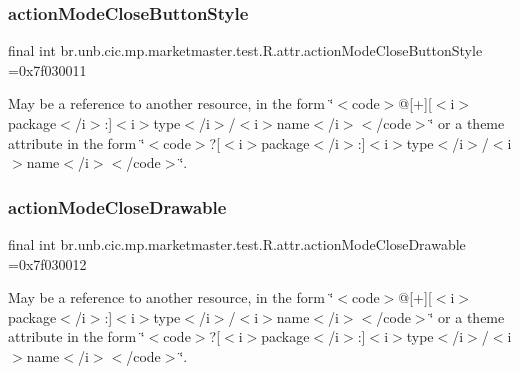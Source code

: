 \subsubsection{\texorpdfstring{action\+Mode\+Close\+Button\+Style}{actionModeCloseButtonStyle}}
{\footnotesize\ttfamily final int br.\+unb.\+cic.\+mp.\+marketmaster.\+test.\+R.\+attr.\+action\+Mode\+Close\+Button\+Style =0x7f030011\hspace{0.3cm}{\ttfamily [static]}}

May be a reference to another resource, in the form \char`\"{}$<$code$>$@\mbox{[}+\mbox{]}\mbox{[}$<$i$>$package$<$/i$>$\+:\mbox{]}$<$i$>$type$<$/i$>$/$<$i$>$name$<$/i$>$$<$/code$>$\char`\"{} or a theme attribute in the form \char`\"{}$<$code$>$?\mbox{[}$<$i$>$package$<$/i$>$\+:\mbox{]}$<$i$>$type$<$/i$>$/$<$i$>$name$<$/i$>$$<$/code$>$\char`\"{}. \mbox{\label{classbr_1_1unb_1_1cic_1_1mp_1_1marketmaster_1_1test_1_1R_1_1attr_a62a0b8e88696015318843bec6cb5d985}} 
\subsubsection{\texorpdfstring{action\+Mode\+Close\+Drawable}{actionModeCloseDrawable}}
{\footnotesize\ttfamily final int br.\+unb.\+cic.\+mp.\+marketmaster.\+test.\+R.\+attr.\+action\+Mode\+Close\+Drawable =0x7f030012\hspace{0.3cm}{\ttfamily [static]}}

May be a reference to another resource, in the form \char`\"{}$<$code$>$@\mbox{[}+\mbox{]}\mbox{[}$<$i$>$package$<$/i$>$\+:\mbox{]}$<$i$>$type$<$/i$>$/$<$i$>$name$<$/i$>$$<$/code$>$\char`\"{} or a theme attribute in the form \char`\"{}$<$code$>$?\mbox{[}$<$i$>$package$<$/i$>$\+:\mbox{]}$<$i$>$type$<$/i$>$/$<$i$>$name$<$/i$>$$<$/code$>$\char`\"{}. \mbox{\label{classbr_1_1unb_1_1cic_1_1mp_1_1marketmaster_1_1test_1_1R_1_1attr_acd48e223069157bf4066641aaa3aae8a}} 
